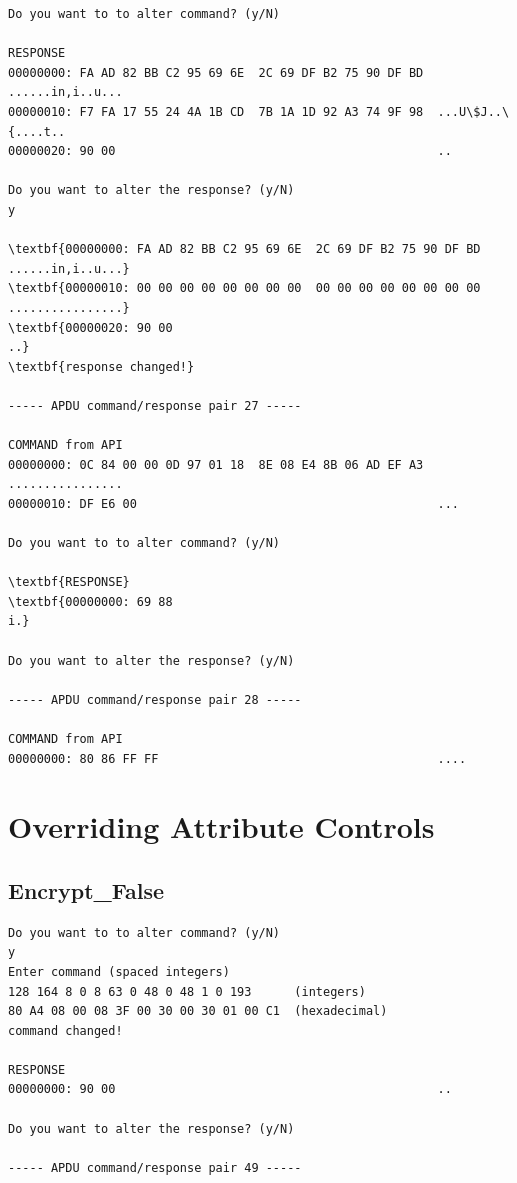 \documentclass[bsc,frontabs,twoside,singlespacing,parskip,deptreport]{infthesis}     %
\begin{document}
\begin{appendices}
\begin{Verbatim}[commandchars=\\\{\}, fontsize=\small]
Do you want to to alter command? (y/N)

RESPONSE
00000000: FA AD 82 BB C2 95 69 6E  2C 69 DF B2 75 90 DF BD  ......in,i..u...
00000010: F7 FA 17 55 24 4A 1B CD  7B 1A 1D 92 A3 74 9F 98  ...U\$J..\{....t..
00000020: 90 00                                             ..

Do you want to alter the response? (y/N)
y

\textbf{00000000: FA AD 82 BB C2 95 69 6E  2C 69 DF B2 75 90 DF BD  ......in,i..u...}
\textbf{00000010: 00 00 00 00 00 00 00 00  00 00 00 00 00 00 00 00  ................}
\textbf{00000020: 90 00                                             ..}
\textbf{response changed!}

----- APDU command/response pair 27 -----

COMMAND from API
00000000: 0C 84 00 00 0D 97 01 18  8E 08 E4 8B 06 AD EF A3  ................
00000010: DF E6 00                                          ...

Do you want to to alter command? (y/N)

\textbf{RESPONSE}
\textbf{00000000: 69 88                                             i.}

Do you want to alter the response? (y/N)

----- APDU command/response pair 28 -----

COMMAND from API
00000000: 80 86 FF FF                                       ....
\end{Verbatim}

\section{Overriding Attribute Controls}
\subsection{Encrypt\_False}
\begin{Verbatim}[commandchars=\\\{\}, fontsize=\small]
Do you want to to alter command? (y/N)
y
Enter command (spaced integers)
128 164 8 0 8 63 0 48 0 48 1 0 193 		(integers)
80 A4 08 00 08 3F 00 30 00 30 01 00 C1	(hexadecimal)
command changed!

RESPONSE
00000000: 90 00                                             ..

Do you want to alter the response? (y/N)

----- APDU command/response pair 49 -----


\end{Verbatim}
\end{appendices}
\end{document}
